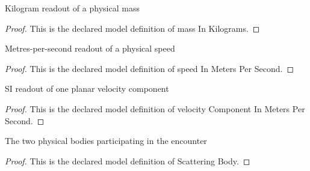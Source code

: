 \begin{definition}
  \label{def:physics:phyx-mini-0641:phyxminiproblems-problemphyxmini0641-massinkilograms}
  Kilogram readout of a physical mass
\end{definition}
\begin{proof}
  This is the declared model definition of mass In Kilograms.
\end{proof}
\begin{definition}
  \label{def:physics:phyx-mini-0641:phyxminiproblems-problemphyxmini0641-speedinmeterspersecond}
  Metres-per-second readout of a physical speed
\end{definition}
\begin{proof}
  This is the declared model definition of speed In Meters Per Second.
\end{proof}
\begin{definition}
  \label{def:physics:phyx-mini-0641:phyxminiproblems-problemphyxmini0641-velocitycomponentinmeterspersecond}
  SI readout of one planar velocity component
\end{definition}
\begin{proof}
  This is the declared model definition of velocity Component In Meters Per Second.
\end{proof}
\begin{definition}
  \label{def:physics:phyx-mini-0641:phyxminiproblems-problemphyxmini0641-scatteringbody}
  The two physical bodies participating in the encounter
\end{definition}
\begin{proof}
  This is the declared model definition of Scattering Body.
\end{proof}
